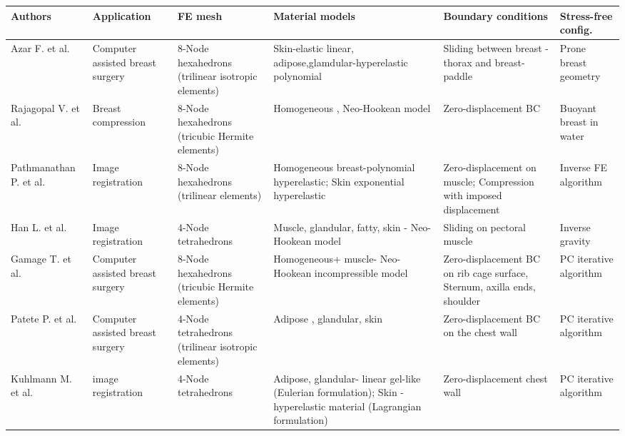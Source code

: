 
\begin{sidewaystable}[!h]
    \centering
    \small
   \begin{tabularx}{22cm}{|p{2.5cm}|p{2.5cm}|p{3.5cm}|X|p{3.5cm}|p{2.5cm}|}
   \hline
   Authors & Application & FE mesh & Material models & Boundary conditions & Stress-free config. \\
\hline
  Azar F. et al. \citep{azar_methods_2002} &  Computer assisted breast surgery & 8-Node hexahedrons (trilinear isotropic elements) & Skin-elastic linear, 
   adipose,glamdular-hyperelastic polynomial & Sliding between breast - thorax and breast-paddle & Prone breast geometry\\
   \hline
 Rajagopal V. et al.  \citep{rajagopal_modelling_2007} & Breast compression & 8-Node hexahedrons (tricubic Hermite elements)& Homogeneous , Neo-Hookean model& Zero-displacement BC & Buoyant breast in water \\
   \hline
  Pathmanathan P. et al. \citep{pathmanathan_predicting_2008}&Image registration & 8-Node hexahedrons (trilinear elements)& Homogeneous breast-polynomial hyperelastic; Skin exponential hyperelastic  & Zero-displacement on muscle; Compression with imposed displacement & Inverse FE algorithm \\
   \hline
  Han L. et al. \citep{han_nonlinear_2014}& Image registration& 4-Node tetrahedrons & Muscle, glandular, fatty, skin - Neo-Hookean model & Sliding on pectoral muscle & Inverse gravity \\
   \hline
 Gamage T. et al.  \citep{gamage_modelling_2012}&  Computer assisted breast surgery & 8-Node hexahedrons (tricubic Hermite elements) & Homogeneous+ muscle- Neo-Hookean incompressible model& Zero-displacement BC on rib cage surface, Sternum, axilla ends, shoulder & PC iterative algorithm \\
   \hline
 Patete P. et al.  \cite{patete_multi_2013}& Computer assisted breast surgery& 4-Node tetrahedrons (trilinear isotropic elements) & Adipose , glandular, skin & Zero-displacement BC on the  chest wall&PC iterative algorithm\\
   \hline
 Kuhlmann M. et al. \citep{kuhlmann_mechanical_2013}& image registration & 4-Node tetrahedrons & Adipose, glandular- linear gel-like (Eulerian formulation); Skin - hyperelastic material (Lagrangian formulation) & Zero-displacement chest wall& PC iterative algorithm\\
   \hline
   

\end{tabularx}
\end{sidewaystable}
